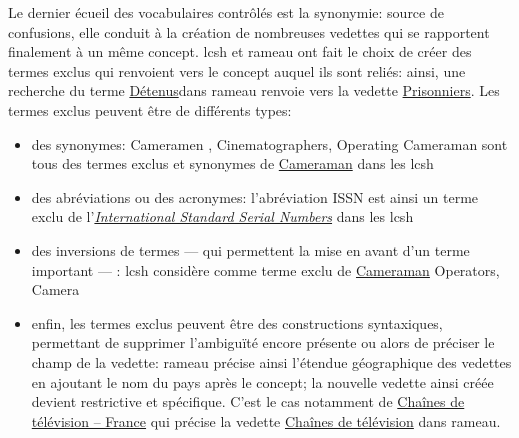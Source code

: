 Le dernier écueil des vocabulaires contrôlés est la synonymie: source de confusions, elle conduit à la création de nombreuses vedettes qui se rapportent finalement à un même concept. \ac{lcsh} et \ac{rameau} ont fait le choix de créer des termes exclus qui renvoient vers le concept auquel ils sont reliés: ainsi, une recherche du terme \og \href{https://data.bnf.fr/fr/search?term=detenus#Rameau}{Détenus}\fg dans \ac{rameau} renvoie vers la vedette \og\href{https://data.bnf.fr/fr/13318775/prisonniers/}{Prisonniers}\fg{}. Les termes exclus peuvent être de différents types:
\begin{itemize}
	\item des synonymes: \og Cameramen \fg{}, \og Cinematographers\fg{}, \og Operating Cameraman\fg{} sont tous des termes exclus et synonymes de \og\href{https://id.loc.gov/authorities/subjects/sh2002011142.html}{Cameraman}\fg{} dans les \ac{lcsh}
	\item des abréviations ou des acronymes: l'abréviation \og ISSN\fg{} est ainsi un terme exclu de l'\og\href{https://id.loc.gov/authorities/subjects/sh85067450.html}{\textit{International Standard Serial Numbers}}\fg{} dans les \ac{lcsh}
	\item des inversions de termes --- qui permettent la mise en avant d'un terme important --- : \ac{lcsh} considère comme terme exclu de \og\href{https://id.loc.gov/authorities/subjects/sh2002011142.html}{Cameraman}\fg{} \og Operators, Camera\fg{}
	\item enfin, les termes exclus peuvent être des constructions syntaxiques, permettant de supprimer l'ambiguïté encore présente ou alors de préciser le champ de la vedette: \ac{rameau} précise ainsi l'étendue géographique des vedettes en ajoutant le nom du pays après le concept; la nouvelle vedette ainsi créée devient restrictive et spécifique. C'est le cas notamment de \og\href{https://data.bnf.fr/fr/11979998/chaines_de_television_--_france/}{Chaînes de télévision -- France}\fg{} qui précise la vedette \og\href{https://data.bnf.fr/fr/11936935/chaines_de_television/}{Chaînes de télévision}\fg{} dans \ac{rameau}.
\end{itemize}
\bigskip
\bigskip

